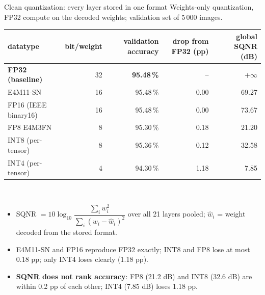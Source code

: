 \documentclass[aspectratio=169,10pt]{beamer}
\newcommand{\hlrow}{\rowcolor{hl}}
\begin{document}
\begin{frame}{Clean quantization: every layer stored in one format}
  \centering
  \small
  Weights-only quantization, FP32 compute on the decoded weights; validation set of 5\,000 images.\\[3mm]
  \begin{tabular}{@{}lrrrr@{}}
    \toprule
    datatype & bit/weight & validation accuracy & drop from FP32 (pp) & global SQNR (dB)\\
    \midrule
    \hlrow \textbf{FP32 (baseline)} & 32 & \textbf{95.48\,\%} & -- & $+\infty$\\
    E4M11-SN & 16 & 95.48\,\% & 0.00 & 69.27\\
    FP16 (IEEE binary16) & 16 & 95.48\,\% & 0.00 & 73.67\\
    FP8 E4M3FN & 8 & 95.30\,\% & 0.18 & 21.20\\
    INT8 (per-tensor) & 8 & 95.36\,\% & 0.12 & 32.58\\
    INT4 (per-tensor) & 4 & 94.30\,\% & 1.18 & 7.85\\
    \bottomrule
  \end{tabular}\\[4mm]
  \begin{itemize}\small
    \item SQNR $=10\log_{10}\dfrac{\sum_i w_i^2}{\sum_i (w_i-\hat w_i)^2}$ over all 21 layers pooled; $\hat w_i$ = weight decoded from the stored format.
    \item E4M11-SN and FP16 reproduce FP32 exactly; INT8 and FP8 lose at most 0.18 pp; only INT4 loses clearly (1.18 pp).
    \item \textbf{SQNR does not rank accuracy}: FP8 (21.2 dB) and INT8 (32.6 dB) are within 0.2 pp of each other; INT4 (7.85 dB) loses 1.18 pp.
  \end{itemize}
\end{frame}
\end{document}
